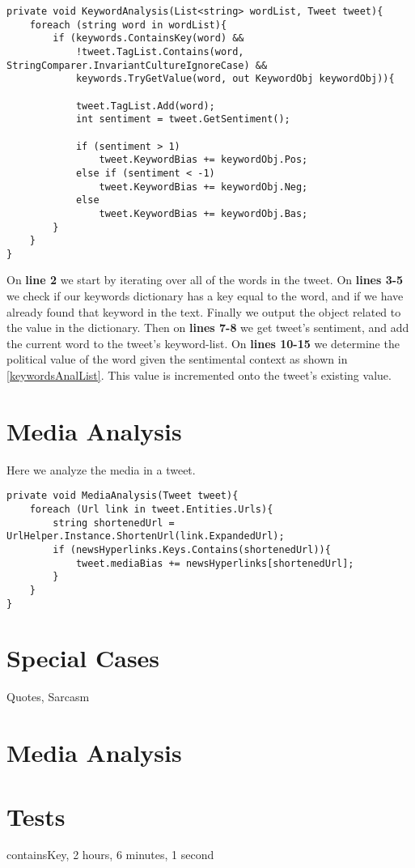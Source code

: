 \begin{minipage}[H]{\linewidth}
\begin{lstlisting}[caption = Method for handling the keyword analysis, label = keywordAnalysisExample] 
private void KeywordAnalysis(List<string> wordList, Tweet tweet){
	foreach (string word in wordList){
    	if (keywords.ContainsKey(word) && 
            !tweet.TagList.Contains(word, StringComparer.InvariantCultureIgnoreCase) && 
            keywords.TryGetValue(word, out KeywordObj keywordObj)){
                        
        	tweet.TagList.Add(word);
            int sentiment = tweet.GetSentiment();

            if (sentiment > 1)
            	tweet.KeywordBias += keywordObj.Pos;
            else if (sentiment < -1)
            	tweet.KeywordBias += keywordObj.Neg;
            else
            	tweet.KeywordBias += keywordObj.Bas;
		}
	}
}
\end{lstlisting}
\end{minipage}

On \textbf{line 2} we start by iterating over all of the words in the tweet. On
\textbf{lines 3-5} we check if our keywords dictionary has a key equal to the
word, and if we have already found that keyword in the text. Finally we output
the  object related to the value in the dictionary. Then on
\textbf{lines 7-8} we get tweet's sentiment, and  add the current word to the
tweet's keyword-list. On \textbf{lines 10-15} we determine the political value
of the word given the sentimental context as shown in
\autoref{keywordsAnalList}. This value is incremented onto the tweet's existing
 value.

\section{Media Analysis}
Here we analyze the media in a tweet.

\begin{minipage}[H]{\linewidth}
\begin{lstlisting}[caption = Method for handling the media analysis, label = mediaAnalysisExample] 
private void MediaAnalysis(Tweet tweet){
	foreach (Url link in tweet.Entities.Urls){
		string shortenedUrl = UrlHelper.Instance.ShortenUrl(link.ExpandedUrl);
        if (newsHyperlinks.Keys.Contains(shortenedUrl)){
        	tweet.mediaBias += newsHyperlinks[shortenedUrl];
        }
	}
}
\end{lstlisting}
\end{minipage}

\section{Special Cases}\label{AlgorithmCases}
Quotes, Sarcasm

\section{Media Analysis}


\section{Tests}
containsKey, 2 hours, 6 minutes, 1 second